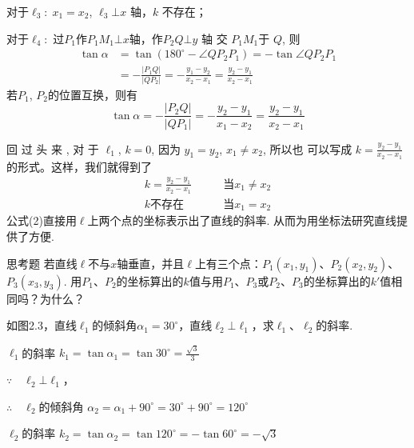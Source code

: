 对于$\ell_3:\; x_1=x_2$, $\ell_3\bot x$ 轴，$k$ 不存在；


对于$\ell_4:$ 过$P_1$作$P_1M_1\bot x$轴，作$P_2Q\bot y$ 轴 交 $P_1M_1$于
$Q$,
则 
\[\begin{split}
    \tan\alpha &=\tan(180^{\circ}-\angle QP_{2}P_{1})=-\tan \angle QP_{2}P_{1}\\
    &=-\frac{|P_{1}Q|}{|QP_{2}|}=-\frac{y_{1}-y_{2}}{x_{2}-x_{1}}=\frac{y_{2}-y_{1}}{x_{2}-x_{1}}
\end{split}\]
若$P_1$, $P_2$的位置互换，则有
$$\tan \alpha=-\frac{|P_{2}Q|}{|QP_{1}|}=-\frac{y_{2}-y_{1}}{x_{1}-x_{2}}=\frac{y_{2}-y_{1}}{x_{2}-x_{1}}$$

回 过 头 来 , 对 于 $\ell_{1}$, $k= 0$, 因为 $y_1=y_2$, $x_1\neq x_2$, 所以也
可以写成 $k=\frac{y_2-y_1}{x_2-x_1}$的形式。这样，我们就得到了
\begin{equation}
    \begin{split}
    k=\frac{y_2-y_1}{x_2-x_1} &\qquad \text{当}x_1\ne x_2\\
    k\text{不存在} &\qquad \text{当}x_1= x_2
    \end{split}\tag{2}
\end{equation}
公式(2)直接用$\ell$上两个点的坐标表示出了直线的斜率. 从而为用坐标法研究直线提供了方便.

\begin{thm}
  {思考题}
若直线$\ell$不与$x$轴垂直，并且$\ell$上有三个点：$P_1(x_1,y_1)$、$P_2(x_2,y_2)$、$P_3(x_3,y_3)$. 用$P_1$、$P_2$的坐标算出的$k$值与用$P_1$、$P_3$或$P_2$、$P_3$的坐标算出的$k'$值相同吗？为什么？  
\end{thm}

\begin{example}
    如图2.3，直线$\ell_1$的倾斜角$\alpha_1=30^{\circ}$，直线$\ell_2\bot\ell_1$，求$\ell_1$、$\ell_2$的斜率.
\end{example}

\begin{solution}
$\ell_1$的斜率 $k_1=\tan\alpha_1=\tan30^{\circ}=\frac{\sqrt{3}}{3}$

$\because\quad \ell_2\bot\ell_1$，

$\therefore\quad \ell_2$的倾斜角 $\alpha_2=\alpha_1+90^{\circ}=30^{\circ}+90^{\circ}=120^{\circ}$

$\ell_2$的斜率 $k_2=\tan\alpha_2=\tan120^{\circ}=-\tan 60^{\circ}=-\sqrt{3}$
\end{solution}

